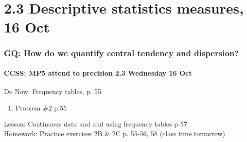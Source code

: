 \documentclass{beamer}
\begin{document}
  \section{2.3 Descriptive statistics measures, 16 Oct}
  \frame
  {
    \frametitle{GQ: How do we quantify central tendency and dispersion?}
    \framesubtitle{CCSS: MP5 attend to precision \hfill \alert{2.3 Wednesday 16 Oct}}

    \begin{block}{Do Now: Frequency tables, p. 55}
    \begin{enumerate}
        \item Problem \#2 p.55
    \end{enumerate}
    \end{block}
    Lesson: Continuous data and and using frequency tables p 57\\ \smallskip
    Homework: Practice exercises 2B \& 2C p. 55-56, 58 (class time tomorrow)
  }
\end{document}
